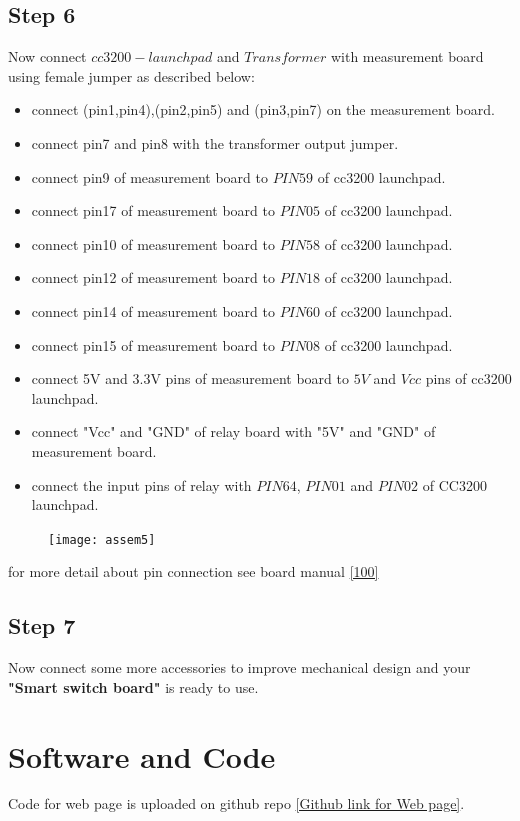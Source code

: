 \documentclass[a4paper,12pt,oneside]{book}
\begin{document}
\subsection*{Step 6}
Now connect $cc3200-launchpad$ and $Transformer$ with measurement board using female jumper as described below:
\begin{itemize}
	\item connect (pin1,pin4),(pin2,pin5) and (pin3,pin7) on the measurement board.
	\item connect pin7 and pin8 with the transformer output jumper.
	\item connect pin9 of measurement board to \textbf{$PIN59$} of cc3200 launchpad.
	\item connect pin17 of measurement board to \textbf{$PIN05$} of cc3200 launchpad.
	\item connect pin10 of measurement board to \textbf{$PIN58$} of cc3200 launchpad.
	\item connect pin12 of measurement board to \textbf{$PIN18$} of cc3200 launchpad.
	\item connect pin14 of measurement board to \textbf{$PIN60$} of cc3200 launchpad.
	\item connect pin15 of measurement board to \textbf{$PIN08$} of cc3200 launchpad.
	\item connect 5V and 3.3V pins of measurement board to $5V$ and $Vcc$ pins of cc3200 launchpad. 
	\item connect "Vcc" and "GND" of relay board with "5V" and "GND" of measurement board.
	\item connect the input pins of relay with $PIN64$, $PIN01$ and $PIN02$
	of CC3200 launchpad.
\end{itemize}
\newpage
\begin{figure}[h]
	\texttt{[image: assem5]}
\end{figure}
for more detail about pin connection see board manual \autoref{100}
\subsection*{Step 7}
Now connect some more accessories to improve mechanical design and your \textbf{"Smart switch board"} is ready to use.

\newpage

\section{Software and Code}
\hspace{7mm} Code for web page is uploaded on github repo \href{https://github.com/eYSIP-2016/eYSIP2016-GHPowerMonitoring/tree/master/Softwares\%20and\%20Codes/Web\%20codes}{[Github link for Web page]}.\\
\end{document}
